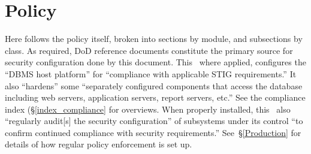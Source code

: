 %
%
%
\chapter{Policy}
\label{Policy}
Here follows the policy itself, broken into sections by module, and
subsections by class.
%
As required, DoD reference documents constitute the primary source for
security configuration done by this document.
%
This \CMITSPolicy\, where applied, configures the ``DBMS host platform''
for ``compliance with applicable STIG requirements.'' It also
``hardens'' some ``separately configured components that access the
database including web servers, application servers, report servers,
etc.'' See the compliance index (\S\ref{index_compliance} for overviews.
When properly installed, this \CMITSPolicy\ also ``regularly audit[s] the
security configuration'' of subsystems under its control ``to confirm
continued compliance with security requirements.'' See~\S\ref{Production}
for details of how regular policy enforcement is set up.


